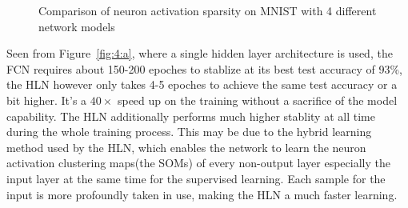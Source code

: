 \documentclass[3p,times,procedia]{elsarticle}
\begin{document}
\begin{figure}[h]
	\centering
	\hspace{-7mm}
	\hspace{-7mm}
	\hspace{-7mm}
	\caption{
		Comparison of neuron activation sparsity 
on MNIST with 4 different network models
		}
	\label{fig:6}
\end{figure}

Seen from Figure~\ref{fig:4:a}, 
where a single hidden layer architecture is used,
the FCN requires about 150-200 epoches to stablize 
at its best test accuracy of 93\%, the HLN however 
only takes 4-5 epoches to achieve the same test 
accuracy or a bit higher. 
It's a $40\times$ speed up 
on the training without a sacrifice of the
model capability. The HLN additionally performs
much higher stablity at all time during the whole
training process. This may be due to the hybrid 
learning method used by the HLN, which enables 
the network to learn the neuron activation 
clustering maps(the SOMs) of every non-output layer
especially the input layer at the same time for
the supervised learning. Each sample for the input
is more profoundly taken in use, making the HLN
a much faster learning.
\end{document}
